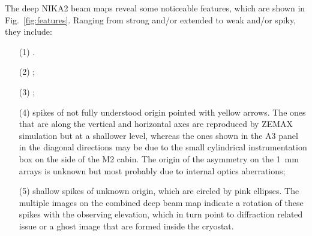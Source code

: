 
The deep NIKA2 beam maps reveal some noticeable features, which are
shown in Fig.~\ref{fig:features}. Ranging from strong and/or extended to
weak and/or spiky, they include:
\begin{itemize}
\item[(1)] .
\item[(2)] ;
\item[(3)] ;  
\item[(4)] spikes of not fully understood origin pointed with yellow
  arrows. The ones that are along the vertical and
  horizontal axes are reproduced by ZEMAX simulation but at a 
  shallower level, whereas the ones shown in the A3 panel in the
  diagonal directions may be due to the small cylindrical
  instrumentation box on the side of the M2 cabin. The origin of the
  asymmetry on the 1~mm arrays is unknown but most probably due to
  internal optics aberrations;
\item[(5)] shallow spikes of unknown origin, which are circled by pink
  ellipses. The multiple images on the combined deep beam map indicate
  a rotation of these spikes with the observing elevation, which in
  turn point to diffraction related issue or a ghost image that are
  formed inside the cryostat.
\end{itemize}

